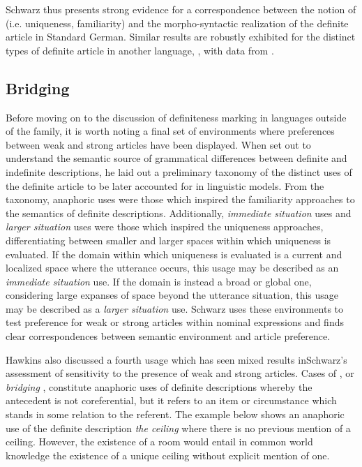 \documentclass[output=paper,modfonts,nonflat]{langsci/langscibook}
\begin{document}
Schwarz thus presents strong evidence for a correspondence between the notion of  (i.e. uniqueness, familiarity) and the morpho-syntactic realization of the definite article in Standard German.  Similar results are robustly exhibited for the distinct types of definite article in another  language, , with data from \citet{Ebert1971}.

\subsection{Bridging} \label{sec:cisneros:2.3}

Before moving on to the discussion of definiteness marking in languages outside of the  family, it is worth noting a final set of  environments where preferences between weak and strong articles have been displayed.  When \citet{Hawkins1978} set out to understand the semantic source of grammatical differences between definite and indefinite descriptions, he laid out a preliminary taxonomy of the distinct uses of the definite article to be later accounted for in linguistic models.  From the taxonomy, anaphoric uses were those which inspired the familiarity approaches to the semantics of definite descriptions. Additionally, \textit{immediate situation} uses and \textit{larger situation} uses were those which inspired the uniqueness approaches, differentiating between smaller and larger spaces within which uniqueness is evaluated.  If the domain within which uniqueness is evaluated is a current and localized space where the utterance occurs, this usage may be described as an \textit{immediate situation} use.  If the domain is instead a broad or global one, considering large expanses of space beyond the utterance situation, this usage may be described as a \textit{larger situation} use.  Schwarz uses these  environments to test preference for weak or strong articles within nominal expressions and finds clear correspondences between semantic environment and article preference.

Hawkins also discussed a fourth usage which has seen mixed results in\linebreak Schwarz's assessment of sensitivity to the presence of weak and strong articles.  Cases of , or \textit{bridging} \citep{Clark1975}, constitute anaphoric uses of definite descriptions whereby the antecedent is not coreferential, but it refers to an item or circumstance which stands in some relation to the referent.  The example below shows an anaphoric use of the definite description \textit{the ceiling} where there is no previous mention of a ceiling.  However, the existence of a room would entail in common world knowledge the existence of a unique ceiling without explicit mention of one.
\end{document}
